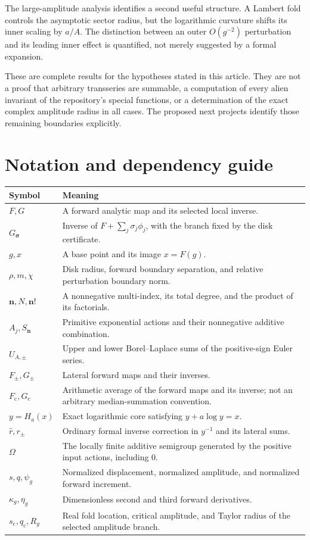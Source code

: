 \documentclass[11pt,a4paper]{article}
\numberwithin{equation}{section}
\theoremstyle{definition}
\theoremstyle{remark}
\newcommand{\bn}{\boldsymbol n}
\newcommand{\bs}{\boldsymbol\sigma}
\newcommand{\cF}{F_{\mathrm c}}
\newcommand{\cG}{G_{\mathrm c}}
\begin{document}
The large-amplitude analysis identifies a second useful structure. A Lambert fold controls the asymptotic sector radius, but the logarithmic curvature shifts its inner scaling by $a/A$. The distinction between an outer $O(g^{-2})$ perturbation and its leading inner effect is quantified, not merely suggested by a formal expansion.

These are complete results for the hypotheses stated in this article. They are not a proof that arbitrary transseries are summable, a computation of every alien invariant of the repository's special functions, or a determination of the exact complex amplitude radius in all cases. The proposed next projects identify those remaining boundaries explicitly.

\appendix
\section{Notation and dependency guide}
\small
\begin{longtable}{@{}p{.22\linewidth}p{.73\linewidth}@{}}
\toprule
Symbol & Meaning\\
\midrule
\endhead
$F,G$ & A forward analytic map and its selected local inverse.\\
$G_{\bs}$ & Inverse of $F+\sum_j\sigma_j\phi_j$, with the branch fixed by the disk certificate.\\
$g,x$ & A base point and its image $x=F(g)$.\\
$\rho,m,\chi$ & Disk radius, forward boundary separation, and relative perturbation boundary norm.\\
$\bn,N,\bn!$ & A nonnegative multi-index, its total degree, and the product of its factorials.\\
$A_j,S_{\bn}$ & Primitive exponential actions and their nonnegative additive combination.\\
$U_{A,\pm}$ & Upper and lower Borel--Laplace sums of the positive-sign Euler series.\\
$F_\pm,G_\pm$ & Lateral forward maps and their inverses.\\
$\cF,\cG$ & Arithmetic average of the forward maps and its inverse; not an arbitrary median-summation convention.\\
$y=H_a(x)$ & Exact logarithmic core satisfying $y+a\log y=x$.\\
$\widehat r,r_\pm$ & Ordinary formal inverse correction in $y^{-1}$ and its lateral sums.\\
$\Omega$ & The locally finite additive semigroup generated by the positive input actions, including $0$.\\
$s,q,\psi_g$ & Normalized displacement, normalized amplitude, and normalized forward increment.\\
$\kappa_g,\eta_g$ & Dimensionless second and third forward derivatives.\\
$s_{\mathrm c},q_{\mathrm c},R_g$ & Real fold location, critical amplitude, and Taylor radius of the selected amplitude branch.\\
\bottomrule
\end{longtable}
\normalsize
\end{document}
